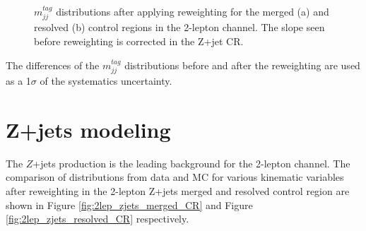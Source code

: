\begin{figure}[ht]
    \centering
    \caption{ $m^{tag}_{jj}$ distributions after applying reweighting for the merged (a) and resolved (b) control regions in the 2-lepton channel. The slope seen before reweighting is corrected in the Z+jet CR.}
    \label{fig:2lep_mtag_before_rw}
\end{figure}

The differences of the $m^{tag}_{jj}$ distributions before and after the reweighting are used as a 1$\sigma$ of the systematics uncertainty.

\section{Z+jets modeling}

The $Z$+jets production is the leading background for the 2-lepton channel. The comparison of distributions from data and MC for various kinematic variables after reweighting in the 2-lepton Z+jets merged and resolved control region are shown in Figure \ref{fig:2lep_zjets_merged_CR} and Figure \ref{fig:2lep_zjets_resolved_CR}
respectively. 

